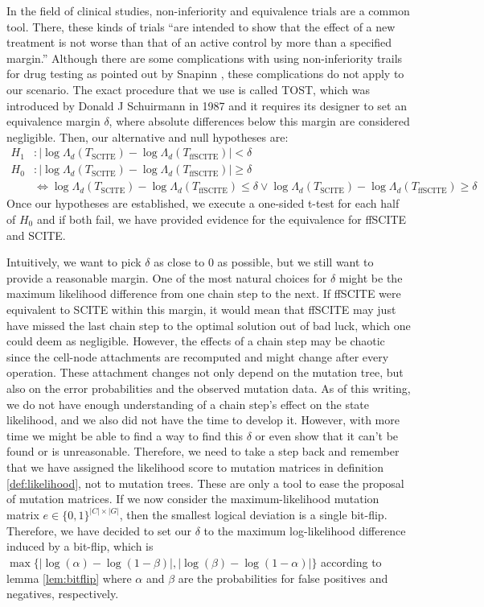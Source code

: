 In the field of clinical studies, non-inferiority and equivalence trials are a common tool. There, these kinds of trials ``are intended to show that the effect of a new treatment is not worse than that of an active control by more than a specified margin.'' \cite{snapinn2000noninferiority} Although there are some complications with using non-inferiority trails for drug testing as pointed out by Snapinn \cite{snapinn2000noninferiority}, these complications do not apply to our scenario. The exact procedure that we use is called \acf{TOST}, which was introduced by Donald J Schuirmann in 1987 \cite{schuirmann1987comparison} and it requires its designer to set an equivalence margin $\delta$, where absolute differences below this margin are considered negligible. Then, our alternative and null hypotheses are:
\begin{align*}
    H_1&: |\log\Lambda_d(T_\mathrm{SCITE}) - \log\Lambda_d(T_\mathrm{ffSCITE})| < \delta \\
    H_0&: |\log\Lambda_d(T_\mathrm{SCITE}) - \log\Lambda_d(T_\mathrm{ffSCITE})| \geq \delta \\
    &\Leftrightarrow \log\Lambda_d(T_\mathrm{SCITE}) - \log\Lambda_d(T_\mathrm{ffSCITE}) \leq \delta \vee \log\Lambda_d(T_\mathrm{SCITE}) - \log\Lambda_d(T_\mathrm{ffSCITE}) \geq \delta
\end{align*}
Once our hypotheses are established, we execute a one-sided t-test for each half of $H_0$ and if both fail, we have provided evidence for the equivalence for \ac{ffSCITE} and \ac{SCITE}.

Intuitively, we want to pick $\delta$ as close to 0 as possible, but we still want to provide a reasonable margin. One of the most natural choices for $\delta$ might be the maximum likelihood difference from one chain step to the next. If ffSCITE were equivalent to SCITE within this margin, it would mean that ffSCITE may just have missed the last chain step to the optimal solution out of bad luck, which one could deem as negligible. However, the effects of a chain step may be chaotic since the cell-node attachments are recomputed and might change after every operation. These attachment changes not only depend on the mutation tree, but also on the error probabilities and the observed mutation data. As of this writing, we do not have enough understanding of a chain step's effect on the state likelihood, and we also did not have the time to develop it. However, with more time we might be able to find a way to find this $\delta$ or even show that it can't be found or is unreasonable. Therefore, we need to take a step back and remember that we have assigned the likelihood score to mutation matrices in definition \ref{def:likelihood}, not to mutation trees. These are only a tool to ease the proposal of mutation matrices. If we now consider the maximum-likelihood mutation matrix $e \in \{0,1\}^{|C| \times |G|}$, then the smallest logical deviation is a single bit-flip. Therefore, we have decided to set our $\delta$ to the maximum log-likelihood difference induced by a bit-flip, which is $\max\{|\log(\alpha) - \log(1-\beta)|, |\log(\beta) - \log(1-\alpha)|\}$ according to lemma \ref{lem:bitflip} where $\alpha$ and $\beta$ are the probabilities for false positives and negatives, respectively.

